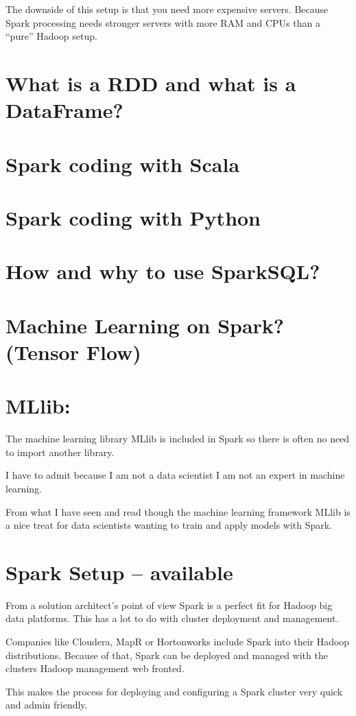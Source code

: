 \documentclass[12pt, numbers=noenddot]{scrreprt} %
\begin{document}
The downside of this setup is that you need more expensive servers. Because Spark processing needs stronger servers with more RAM and CPUs than a “pure” Hadoop setup.


\section{What is a RDD and what is a DataFrame?}
\section{Spark coding with Scala}
\section{Spark coding with Python}
\section{How and why to use SparkSQL?}
\section{Machine Learning on Spark? (Tensor Flow)}

\section{MLlib:} The machine learning library MLlib is included in Spark so there is often no need to import another library.

I have to admit because I am not a data scientist I am not an expert in machine learning.

From what I have seen and read though the machine learning framework MLlib is a nice treat for data scientists wanting to train and apply models with Spark.

\section{Spark Setup -- available}
From a solution architect’s point of view Spark is a perfect fit for Hadoop big data platforms. This has a lot to do with cluster deployment and management.

Companies like Cloudera, MapR or Hortonworks include Spark into their Hadoop distributions. Because of that, Spark can be deployed and managed with the clusters Hadoop management web fronted.

This makes the process for deploying and configuring a Spark cluster very quick and admin friendly.
\end{document}
